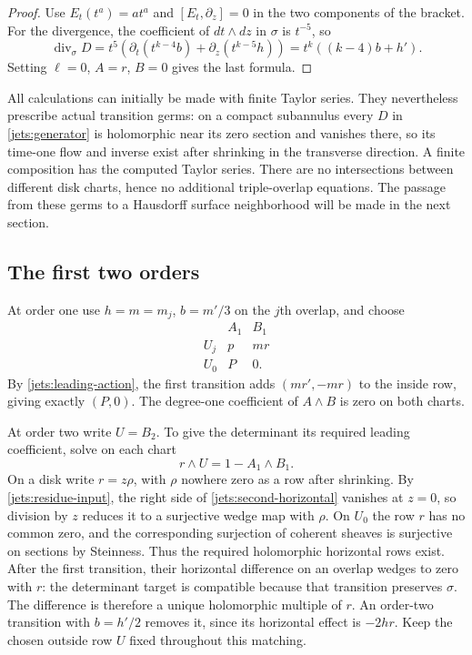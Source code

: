 \begin{proof}
Use $E_t(t^a)=at^a$ and $[E_t,\partial_z]=0$ in the two components of
the bracket.  For the divergence, the coefficient of $dt\wedge dz$ in
$\sigma$ is $t^{-5}$, so
\[
 \operatorname{div}_{\sigma}D
 =t^5\left(\partial_t(t^{k-4}b)
              +\partial_z(t^{k-5}h)\right)
 =t^k((k-4)b+h').
\]
Setting $\ell=0$, $A=r$, $B=0$ gives the last formula.
\end{proof}

All calculations can initially be made with finite Taylor series.
They nevertheless prescribe actual transition germs: on a compact
subannulus every $D$ in \eqref{jets:generator} is holomorphic near its
zero section and vanishes there, so its time-one flow and inverse exist
after shrinking in the transverse direction.  A finite composition has
the computed Taylor series.  There are no intersections between
different disk charts, hence no additional triple-overlap equations.
The passage from these germs to a Hausdorff surface neighborhood will
be made in the next section.

\subsection{The first two orders}

At order one use $h=m=m_j$, $b=m'/3$ on the $j$th overlap, and choose
\begin{equation}\label{jets:first-order}
\begin{array}{c|cc}
 &A_1&B_1\\ \hline
 U_j&p&mr\\
 U_0&P&0.
\end{array}
\end{equation}
By \eqref{jets:leading-action}, the first transition adds
$(mr',-mr)$ to the inside row, giving exactly $(P,0)$.
The degree-one coefficient of $A\wedge B$ is zero on both charts.

At order two write $U=B_2$.  To give the determinant its required
leading coefficient, solve on each chart
\begin{equation}\label{jets:second-horizontal}
 r\wedge U=1-A_1\wedge B_1.
\end{equation}
On a disk write $r=z\rho$, with $\rho$ nowhere zero as a row after
shrinking.  By \eqref{jets:residue-input}, the right side of
\eqref{jets:second-horizontal} vanishes at $z=0$, so division by $z$
reduces it to a surjective wedge map with $\rho$.
On $U_0$ the row $r$ has no common zero, and the corresponding
surjection of coherent sheaves is surjective on sections by
Steinness.  Thus the required holomorphic horizontal rows exist.
After the first transition, their horizontal difference on an overlap
wedges to zero with $r$: the determinant target is compatible because
that transition preserves $\sigma$.
The difference is therefore a unique holomorphic multiple of $r$.
An order-two transition with $b=h'/2$ removes it, since its horizontal
effect is $-2hr$.  Keep the chosen outside row $U$ fixed throughout this
matching.

